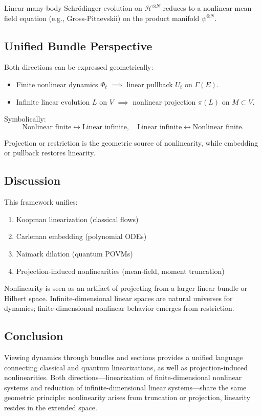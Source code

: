 \begin{example}
Linear many-body Schrödinger evolution on $\mathcal{H}^{\otimes N}$ reduces to
    a nonlinear mean-field equation (e.g., Gross-Pitaevskii) on the product
    manifold $\psi^{\otimes N}$.
\end{example}

\subsection{Unified Bundle Perspective}

Both directions can be expressed geometrically:

\begin{itemize}
\item Finite nonlinear dynamics $\Phi_t$ $\implies$ linear pullback $U_t$ on $\Gamma(E)$.
\item Infinite linear evolution $L$ on $V$ $\implies$ nonlinear projection $\pi(L)$ on $M \subset V$.
\end{itemize}

Symbolically:
\[
\text{Nonlinear finite} \leftrightarrow \text{Linear infinite}, \quad
\text{Linear infinite} \leftrightarrow \text{Nonlinear finite}.
\]

Projection or restriction is the geometric source of nonlinearity, while
embedding or pullback restores linearity.

\subsection{Discussion}

This framework unifies:

\begin{enumerate}
\item Koopman linearization (classical flows)
\item Carleman embedding (polynomial ODEs)
\item Naimark dilation (quantum POVMs)
\item Projection-induced nonlinearities (mean-field, moment truncation)
\end{enumerate}

Nonlinearity is seen as an artifact of projecting from a larger linear bundle
or Hilbert space. Infinite-dimensional linear spaces are natural universes for
dynamics; finite-dimensional nonlinear behavior emerges from restriction.

\subsection{Conclusion}

Viewing dynamics through bundles and sections provides a unified language
connecting classical and quantum linearizations, as well as projection-induced
nonlinearities. Both directions—linearization of finite-dimensional nonlinear
systems and reduction of infinite-dimensional linear systems—share the same
geometric principle: nonlinearity arises from truncation or projection,
linearity resides in the extended space.

